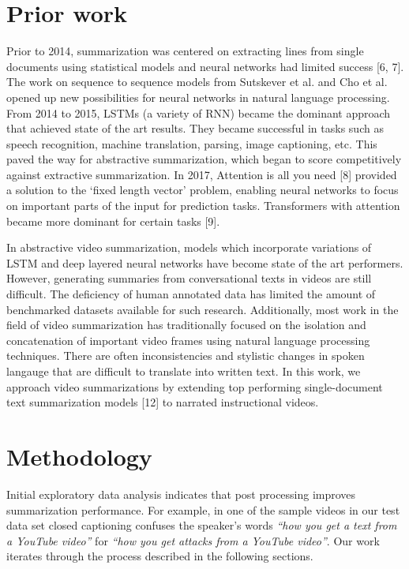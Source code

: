 \documentclass{article}
\begin{document}
\section{Prior work}

Prior to 2014, summarization was centered on extracting lines from single documents using statistical models and neural networks had limited success [6, 7]. The work on sequence to sequence models from Sutskever et al. and Cho et al. opened up new possibilities for neural networks in natural language processing. From 2014 to 2015, LSTMs (a variety of RNN) became the dominant approach that achieved state of the art results. They became successful in tasks such as speech recognition, machine translation, parsing, image captioning, etc. This paved the way for abstractive summarization, which began to score competitively against extractive summarization. In 2017, Attention is all you need [8] provided a solution to the ‘fixed length vector’ problem, enabling neural networks to focus on important parts of the input for prediction tasks. Transformers with attention became more dominant for certain tasks [9].

In abstractive video summarization, models which incorporate variations of LSTM and deep layered neural networks have become state of the art performers. However, generating summaries from conversational texts in videos are still difficult. The deficiency of human annotated data has limited the amount of benchmarked datasets available for such research. Additionally, most work in the field of video summarization has traditionally focused on the isolation and concatenation of important video frames using natural language processing techniques. There are often inconsistencies and stylistic changes in spoken langauge that are difficult to translate into written text. In this work, we approach video summarizations by extending top performing single-document text summarization models [12] to narrated instructional videos.




 
\section{Methodology}

Initial exploratory data analysis indicates that post processing improves summarization performance. For example, in one of the sample videos in our test data set closed captioning confuses the speaker’s words \emph{“how you get a text from a YouTube video”} for  \emph{“how you get attacks from a YouTube video”}. Our work iterates through the process described in the following sections.
 
\end{document}

